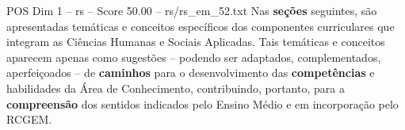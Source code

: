 \begin{textsample}{POS Dim 1 – rs – Score 50.00 – rs/rs\_em\_52.txt}
Nas \textbf{seções} seguintes, são apresentadas temáticas e conceitos específicos dos componentes curriculares que integram as Ciências Humanas e Sociais Aplicadas.
Tais temáticas e conceitos aparecem apenas como sugestões – podendo ser adaptados, complementados, aperfeiçoados – de \textbf{caminhos} para o desenvolvimento das \textbf{competências} e habilidades da Área de Conhecimento, contribuindo, portanto, para a \textbf{compreensão} dos sentidos indicados pelo Ensino Médio e em incorporação pelo RCGEM.

\end{textsample}
